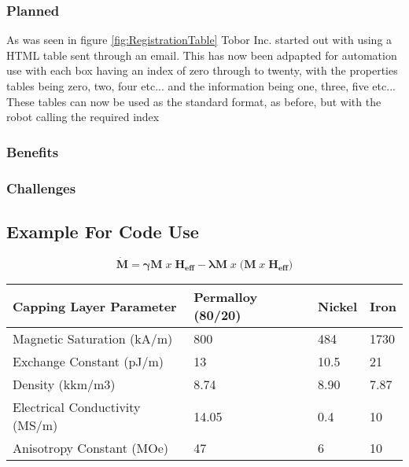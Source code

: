 \documentclass[12]{article}
\begin{document}
\subsubsection{Planned}

As was seen in figure \ref{fig:RegistrationTable} Tobor Inc. started out with using a HTML table sent through an email. This has now been adpapted for automation use with each box having an index of zero through to twenty, with the properties tables being zero, two, four etc... and the information being one, three, five etc... These tables can now be used as the standard format, as before, but with the robot calling the required index

\subsubsection{Benefits}

\subsubsection{Challenges}


\subsection{Example For Code Use}


\begin{equation}\label{eq:LL}
\bm{\dot{M}} = \bm{ \gamma M} \; x \; \bm{ H_{eff}} - \bm{ \lambda M} \; x \; \bm{  (M } \; x \; \bm{ H_{eff})}
\end{equation}

\begin{table}[H]
\centering
\begin{tabular}{l|l|l|l}
Capping Layer Parameter                      & Permalloy (80/20) & Nickel                    & Iron                       \\ \hline
Magnetic Saturation (kA/m)          & 800                  & 484 & 1730 \\
Exchange Constant (pJ/m)           &  13                 & 10.5                      & 21                         \\
Density (kkm/m3) &   8.74                & 8.90                      & 7.87                       \\
Electrical Conductivity (MS/m)     &       14.05            & 0.4                       & 10         \\
Anisotropy Constant (MOe) & 47 & 6 & 10 \\
               
\end{tabular}
\end{table}
\end{document}
